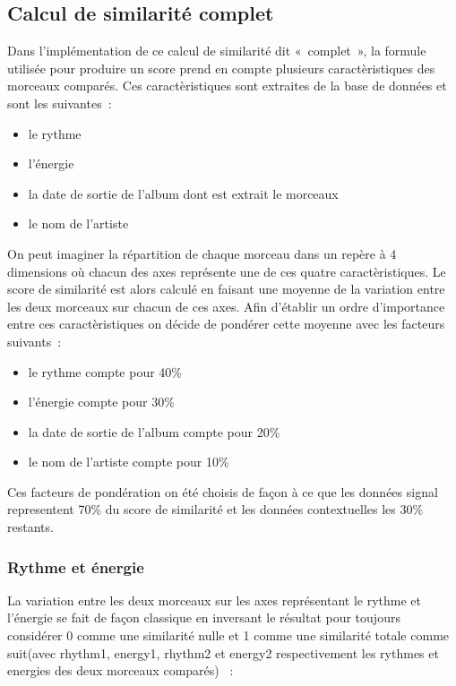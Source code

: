 \subsection{Calcul de similarité complet}
\label{impl:similarite:complet}

Dans l'implémentation de ce calcul de similarité dit «~complet~», la formule utilisée pour produire un score prend en compte plusieurs caractèristiques des morceaux comparés. Ces caractèristiques sont extraites de la base de données et sont les suivantes~:

\begin{itemize}
\item le rythme
\item l'énergie
\item la date de sortie de l'album dont est extrait le morceaux
\item le nom de l'artiste
\end{itemize}

On peut imaginer la répartition de chaque morceau dans un repère à 4 dimensions où chacun des axes représente une de ces quatre caractèristiques. Le score de similarité est alors calculé en faisant une moyenne de la variation entre les deux morceaux sur chacun de ces axes.\newline
Afin d'établir un ordre d'importance entre ces caractèristiques on décide de pondérer cette moyenne avec les facteurs suivants~:

\begin{itemize}
\item le rythme compte pour 40\%
\item l'énergie compte pour 30\%
\item la date de sortie de l'album compte pour 20\%
\item le nom de l'artiste compte pour 10\%
\end{itemize}

Ces facteurs de pondération on été choisis de façon à ce que les données signal representent 70\% du score de similarité et les données contextuelles les 30\% restants.

\subsubsection{Rythme et énergie}
\label{impl:similarite:complet:rhythm}

La variation entre les deux morceaux sur les axes représentant le rythme et l'énergie se fait de façon classique en inversant le résultat pour toujours considérer 0 comme une similarité nulle et 1 comme une similarité totale comme suit(avec rhythm1, energy1, rhythm2 et energy2 respectivement les rythmes et energies des deux morceaux comparés) ~:

